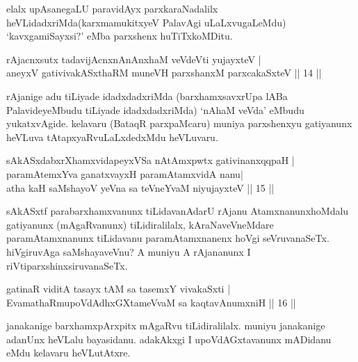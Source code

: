 \begin{artha}
elalx upAsanegaLU paravidAyx parxkaraNadalilx heVLidadxriMda\break (karxmamukitxyeV PalavAgi uLaLxvugaLeMdu) `kavxgamiSayxsi?' eMba parxshenx huTiTxkoMDitu.
\end{artha}


\begin{shl}
rAjacnxsutx tadavijAcnxnAnAnxhaM veVdeVti yujayxteV |\\
aneyxV gativivakASxthaRM muneVH parxshanxM parxcakaSxteV \hfill || 14 || 
\end{shl}

\begin{artha}
rAjanige adu tiLiyade idadxdadxriMda (barxhamxsavxrUpa lABa PalavideyeMbudu tiLiyade idadxdadxriMda) `nAhaM veVda' eMbudu yukatxvAgide. kelavaru (BataqR parxpaMcaru) muniya parxshenxyu gatiyanunx heVLuva tAtapxyaRvuLaLxdedxMdu heVLuvaru.
\end{artha}


\begin{shl}
sAkASxdabxrXhamxvidapeyxVSa nA\s \s tAmxpwtx gativinanxqqpaH |\\
paramAtemxYva ganatxvayxH paramAtamxvidA nanu|\\
atha kaH saMshayoV yeVna sa teVneYvaM niyujayxteV \hfill || 15 || 
\end{shl}

\begin{artha}
sAkASxtf parabarxhamxvanunx tiLidavanAdarU rAjanu Atamxnanunx\break hoMdalu gatiyanunx (mAgaRvanunx) tiLidiralilalx, kAraNaveVneMdare paramAtamxnanunx tiLidavanu paramAtamxnanenx hoVgi seVruvanaSeTx. hiVgiruvAga saMshayaveVnu? A muniyu A rAjananunx I riVti\break parxshinxsiruvanaSeTx.
\end{artha}


\begin{shl}
gatinaR viditA tasayx tAM sa tasemxY vivakaSxti |\\
EvamathaRmupoVdAdhxGXtameVvaM sa kaqtavAnumxniH \hfill || 16 || 
\end{shl}

\begin{artha}
janakanige barxhamxpArxpitx mAgaRvu tiLidiralilalx. muniyu janakanige adanUnx heVLalu bayasidanu. adakAkxgi I upoVdAGxtavanunx mADidanu eMdu kelavaru heVLutAtxre.
\end{artha}

